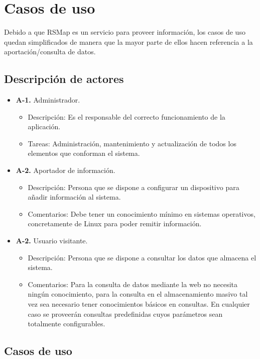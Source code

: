 \section{Casos de uso}

Debido a que RSMap es un servicio para proveer información, los casos de uso quedan simplificados de manera que la mayor parte de ellos hacen referencia a la aportación/consulta de datos.

\subsection{Descripción de actores}

\begin{itemize}
  \item \textbf{A-1.} Administrador.
  \begin{itemize}
   \item Descripción: Es el responsable del correcto funcionamiento de la aplicación.
   \item Tareas: Administración, mantenimiento y actualización de todos los elementos que conforman el sistema.
  \end{itemize}

  \item \textbf{A-2.} Aportador de información.
  \begin{itemize}
   \item Descripción: Persona que se dispone a configurar un dispositivo para añadir información al sistema.
   \item Comentarios: Debe tener un conocimiento mínimo en sistemas operativos, concretamente de Linux para poder remitir información.
  \end{itemize}

  \item \textbf{A-2.} Usuario visitante.
  \begin{itemize}
   \item Descripción: Persona que se dispone a consultar los datos que almacena el sistema.
   \item Comentarios: Para la consulta de datos mediante la web no necesita ningún conocimiento, para la consulta en el almacenamiento masivo tal vez sea necesario tener conocimientos básicos en consultas. En cualquier caso se proveerán consultas predefinidas cuyos parámetros sean totalmente configurables.
  \end{itemize}
\end{itemize}

\subsection{Casos de uso}

